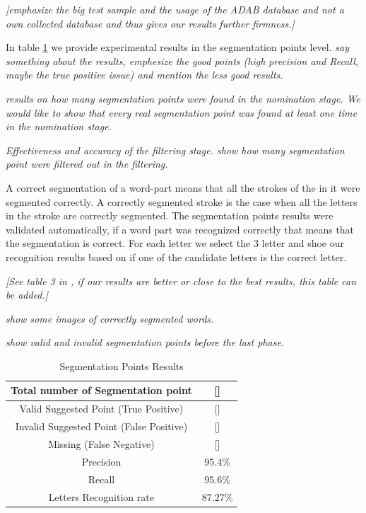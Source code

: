 \documentclass[journal,compsoc]{IEEEtran}
\begin{document}
\emph{[emphasize the big test sample and the usage of the ADAB database and not a own collected database and thus gives our results further firmness.]}

In table \ref{table:sp_results} we provide experimental results in the segmentation points level. \emph{say something about the results, emphesize the good points (high precision and Recall, maybe the true positive issue) and mention the less good results}.   

\emph{results on how many segmentation points were found in the nomination stage. We would like to show that every real segmentation point was found at least one time in the nomination stage.}

\emph{Effectiveness and accuracy of the filtering stage. show how many segmentation point were filtered out in the filtering.}

A correct segmentation of a word-part means that all the strokes of the in it were segmented correctly. A correctly segmented stroke is the case when all the letters in the stroke are correctly segmented.
The segmentation points results were validated automatically, if a word part was recognized correctly that means that the segmentation is correct. For each letter we select the 3 letter and shoe our recognition results based on if one of the candidate letters is the correct letter.

\emph{[See table 3 in \cite{eraqi2012new}, if our results are better or close to the best results, this table can be added.]}

\emph{show some images of correctly segmented words.}

\emph{show valid and invalid segmentation points before the last phase.}


\begin{table}[h]
\caption{Segmentation Points Results}
\begin{tabular}{ | c | c | }
  \hline
  Total number of Segmentation point & [] \\
  \hline
  Valid Suggested Point (True Positive) & [] \\
  \hline
  Invalid Suggested Point (False Positive) & [] \\
  \hline
  Missing (False Negative) & [] \\
  \hline                                    
  Precision & 95.4\% \\ 
 \hline
  Recall &  95.6\% \\ 
 \hline
  Letters Recognition rate & 87.27\% \\
\hline
\end{tabular}
\centering
\label{table:sp_results} 
\end{table}
\end{document}
